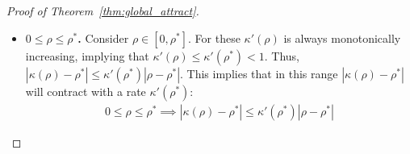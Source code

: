 \documentclass[twoside]{article}
\theoremstyle{definition}
\begin{document}
\begin{proof}[Proof of Theorem~\ref{thm:global_attract}]
\begin{itemize}

\item \textbf{$0\le \rho \le \rho^*$.}
Consider $\rho \in [0,\rho^*]$. For these $\kappa'(\rho)$ is always monotonically increasing, implying that $\kappa'(\rho)\le \kappa'(\rho^*) < 1$. Thus, $|\kappa(\rho)-\rho^*| \le \kappa'(\rho^*) |\rho - \rho^*|$. This implies that in this range $|\kappa(\rho)-\rho^*|$ will contract with a rate $\kappa'(\rho^*)$:
\begin{align*}
0\le \rho \le \rho^* \implies |\kappa(\rho) - \rho^*| \le \kappa'(\rho^*) |\rho-\rho^*|
\end{align*}


\end{itemize}
\end{proof}
\end{document}
